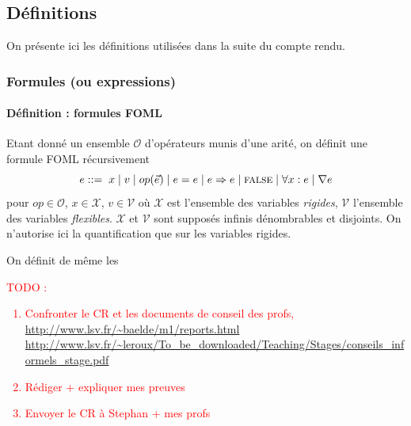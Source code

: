 \documentclass[12pt]{article}
\newcommand{\raph}[1]{\textcolor{red}{#1}}
\newcommand{\FALSE}{\textsc{false}}
\begin{document}
\subsection{Définitions}

On présente ici les définitions utilisées dans la suite du compte rendu.

\subsubsection{Formules (ou expressions)}

\paragraph{Définition : formules FOML}
Etant donné un ensemble $\mathcal{O}$ d'opérateurs munis d'une arité, on définit une formule FOML récursivement
\[ e ::= \; x \; | \; v \; | \; op(\vec{e}) \; | \; e = e
  \; | \; e \Rightarrow e \; | \; \FALSE \; | \; \forall x : e \; | \; \nabla e \]
pour $op \in \mathcal{O}$, $x \in \mathcal{X}$, $v \in \mathcal{V}$ où $\mathcal{X}$ est l'ensemble des variables \emph{rigides}, $\mathcal{V}$ l'ensemble des variables \emph{flexibles}. $\mathcal{X}$ et $\mathcal{V}$ sont supposés infinis dénombrables et disjoints.
On n'autorise ici la quantification que sur les variables rigides.

On définit de même les 






\raph{%
TODO :
\begin{enumerate}
\item
  Confronter le CR et les documents de conseil des profs,
  \url{http://www.lsv.fr/~baelde/m1/reports.html}
  \url{http://www.lsv.fr/~leroux/To_be_downloaded/Teaching/Stages/conseils_informels_stage.pdf}
\item
  Rédiger + expliquer mes preuves
\item
  Envoyer le CR à Stephan + mes profs
\end{enumerate}
}


\end{document}
